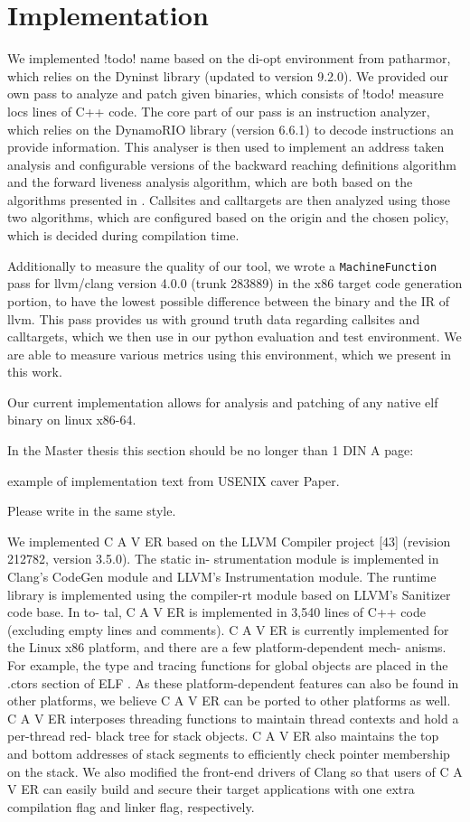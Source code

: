 \chapter{Implementation}
\label{chapter:Related_Work}
We implemented {!todo! name} based on the di-opt environment from patharmor\cite{patharmor}, which relies on the Dyninst library \cite{dyninst} (updated to version 9.2.0). We provided our own pass to analyze and patch given binaries, which consists of {!todo! measure locs} lines of C++ code. The core part of our pass is an instruction analyzer, which relies on the DynamoRIO library \cite{dynamorio} (version 6.6.1) to decode instructions an provide information. This analyser is then used to implement an address taken analysis and configurable versions of the backward reaching definitions algorithm and the forward liveness analysis algorithm, which are both based on the algorithms presented in \cite{typearmor}. Callsites and calltargets are then analyzed using those two algorithms, which are configured based on the origin and the chosen policy, which is decided during compilation time.

Additionally to measure the quality of our tool, we wrote a \texttt{MachineFunction} pass for llvm/clang version 4.0.0 (trunk 283889) in the x86 target code generation portion, to have the lowest possible difference between the binary and the IR of llvm. This pass provides us with ground truth data regarding callsites and calltargets, which we then use in our python evaluation and test environment. We are able to measure various metrics using this environment, which we present in this work.

Our current implementation allows for analysis and patching of any native elf binary on linux x86-64. 



In the Master thesis this section should be no longer than 1 DIN A page:

example of implementation text from USENIX caver Paper.

Please write in the same style.


We implemented C A V ER based on the LLVM Compiler
project [43] (revision 212782, version 3.5.0). The static in-
strumentation module is implemented in Clang’s CodeGen
module and LLVM’s Instrumentation module. The
runtime library is implemented using the compiler-rt
module based on LLVM’s Sanitizer code base. In to-
tal, C A V ER is implemented in 3,540 lines of C++ code
(excluding empty lines and comments).
C A V ER is currently implemented for the Linux x86
platform, and there are a few platform-dependent mech-
anisms. For example, the type and tracing functions for
global objects are placed in the .ctors section of ELF . As
these platform-dependent features can also be found in
other platforms, we believe C A V ER can be ported to other
platforms as well. C A V ER interposes threading functions
to maintain thread contexts and hold a per-thread red-
black tree for stack objects. C A V ER also maintains the
top and bottom addresses of stack segments to efficiently
check pointer membership on the stack. We also modified
the front-end drivers of Clang so that users of C A V ER can
easily build and secure their target applications with one
extra compilation flag and linker flag, respectively.
